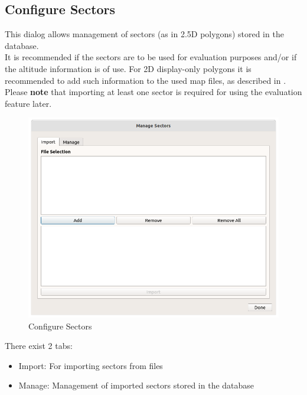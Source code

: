 \subsection{Configure Sectors}
\label{sec:ui_configure_sectors}

This dialog allows management of sectors (as in 2.5D polygons) stored in the database. \\

It is recommended if the sectors are to be used for evaluation purposes and/or if the altitude information is of use. For 2D display-only polygons it is recommended to add such information to the used map files, as described in . \\

Please \textbf{note} that importing at least one sector is required for using the evaluation feature later.

\begin{figure}[H]
  \center
    \hspace*{-0.5cm}
    \includegraphics[width=15cm]{figures/configure_sectors.png}
  \caption{Configure Sectors}
\end{figure}

There exist 2 tabs:

\begin{itemize}
\item Import: For importing sectors from files
\item Manage: Management of imported sectors stored in the database
\end{itemize}
\ \\

